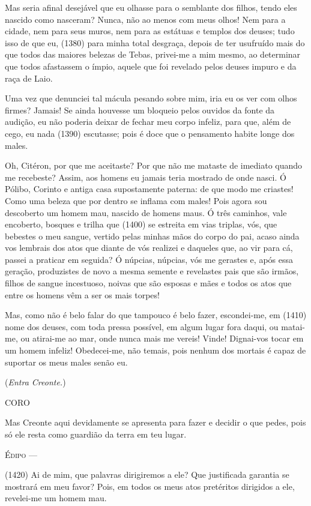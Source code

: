Mas seria afinal desejável que eu olhasse para o semblante dos filhos,
tendo eles nascido como nasceram? Nunca, não ao menos com meus olhos!
Nem para a cidade, nem para seus muros, nem para as estátuas e templos
dos deuses; tudo isso de que eu, (1380) para minha total desgraça,
depois de ter usufruído mais do que todos das maiores belezas de Tebas,
privei-me a mim mesmo, ao determinar que todos afastassem o ímpio,
aquele que foi revelado pelos deuses impuro e da raça de Laio.

Uma vez que denunciei tal mácula pesando sobre mim, iria eu os ver com
olhos firmes? Jamais! Se ainda houvesse um bloqueio pelos ouvidos da
fonte da audição, eu não poderia deixar de fechar meu corpo infeliz,
para que, além de cego, eu nada (1390) escutasse; pois é doce que o
pensamento habite longe dos males.

Oh, Citéron, por que me aceitaste? Por que não me mataste de imediato
quando me recebeste? Assim, aos homens eu jamais teria mostrado de onde
nasci. Ó Pólibo, Corinto e antiga casa supostamente paterna: de que modo
me criastes! Como uma beleza que por dentro se inflama com males! Pois
agora sou descoberto um homem mau, nascido de homens maus. Ó três
caminhos, vale encoberto, bosques e trilha que (1400) se estreita em
vias triplas, vós, que bebestes o meu sangue, vertido pelas minhas mãos
do corpo do pai, acaso ainda vos lembrais dos atos que diante de vós
realizei e daqueles que, ao vir para cá, passei a praticar em seguida? Ó
núpcias, núpcias, vós me gerastes e, após essa geração, produzistes de
novo a mesma semente e revelastes pais que são irmãos, filhos de sangue
incestuoso, noivas que são esposas e mães e todos os atos que entre os
homens vêm a ser os mais torpes!

Mas, como não é belo falar do que tampouco é belo fazer, escondei-me, em
(1410) nome dos deuses, com toda pressa possível, em algum lugar fora
daqui, ou matai-me, ou atirai-me ao mar, onde nunca mais me vereis!
Vinde! Dignai-vos tocar em um homem infeliz! Obedecei-me, não temais,
pois nenhum dos mortais é capaz de suportar os meus males senão eu.

(\emph{Entra Creonte.})

\textsc{CORO}

Mas Creonte aqui devidamente se apresenta para fazer e decidir o que
pedes, pois só ele resta como guardião da terra em teu lugar.

\textsc{Édipo} ---

(1420) Ai de mim, que palavras dirigiremos a ele? Que justificada
garantia se mostrará em meu favor? Pois, em todos os meus atos
pretéritos dirigidos a ele, revelei-me um homem mau.

